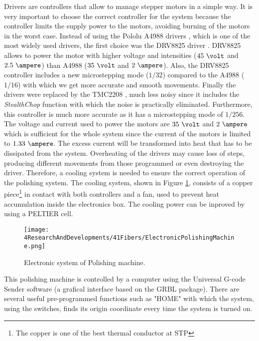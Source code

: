 \begin{enumerate}
Drivers are controllers that allow to manage stepper motors in a simple way. It is very important to choose the correct controller for the system because the controller limits the supply power to the motors, avoiding burning of the motors in the worst case. Instead of using the Pololu A4988 drivers \cite{A4988Driver}, which is one of the most widely used drivers, the first choice was the DRV8825 driver \cite{DRV8825Driver}. DRV8825 allows to power the motor with higher voltage and intensities ($45~\volt$ and $2.5~\ampere$) than A4988 ($35~\volt$ and $2~\ampere$). Also, the DRV8825 controller includes a new microstepping mode ($1/32$) compared to the A4988 ($1/16$) with which we get more accurate and smooth movements. Finally the drivers were replaced by the TMC2208 \cite{TMC2208Driver}, much less noisy since it includes the \textit{StealthChop} function with which the noise is practically eliminated. Furthermore, this controller is much more accurate as it has a microstepping mode of $1/256$. The voltage and current used to power the motors are $35~\volt$ and $2~\ampere$ which is sufficient for the whole system since the current of the motors is limited to $1.33~\ampere$. The excess current will be transformed into heat that has to be dissipated from the system. Overheating of the drivers may cause loss of steps, producing different movements from those programmed or even destroying the driver. Therefore, a cooling system is needed to ensure the correct operation of the polishing system. The cooling system, shown in Figure \ref{fig:ElectronicSystemPolishingMachine}, consists of a copper piece\footnote{The copper is one of the best thermal conductor at STP} in contact with both controllers and a fan, used to prevent heat accumulation inside the electronics box. The cooling power can be inproved by using a PELTIER cell.

\begin{figure}[h]
\centering
\texttt{[image: 4ResearchAndDevelopments/41Fibers/ElectronicPolishingMachine.png]}
\caption{Electronic system of Polishing machine.\label{fig:ElectronicSystemPolishingMachine}}
\end{figure}

\end{enumerate}

This polishing machine is controlled by a computer using the Universal G-code Sender software (a grafical interface based on the GRBL package). There are several useful pre-programmed functions such as "HOME" with which the system, using the switches, finds its origin coordinate every time the system is turned on. 

